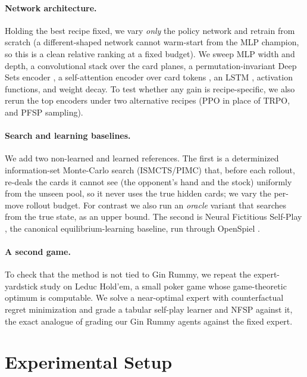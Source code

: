 \documentclass[letterpaper]{article} %
\begin{document}
\paragraph{Network architecture.}
Holding the best recipe fixed, we vary \emph{only} the policy network and retrain
from scratch (a different-shaped network cannot warm-start from the MLP champion,
so this is a clean relative ranking at a fixed budget). We sweep MLP width and
depth, a convolutional stack over the card planes, a permutation-invariant Deep
Sets encoder \citep{deepsets}, a self-attention encoder over card tokens
\citep{transformer}, an LSTM \citep{lstm}, activation functions, and weight decay.
To test whether any gain is recipe-specific, we also rerun the top encoders under
two alternative recipes (PPO in place of TRPO, and PFSP sampling).

\paragraph{Search and learning baselines.}
We add two non-learned and learned references. The first is a determinized
information-set Monte-Carlo search (ISMCTS/PIMC) \citep{ismcts,pimc} that, before
each rollout, re-deals the cards it cannot see (the opponent's hand and the stock)
uniformly from the unseen pool, so it never uses the true hidden cards; we vary
the per-move rollout budget. For contrast we also run an \emph{oracle} variant
that searches from the true state, as an upper bound. The second is Neural
Fictitious Self-Play \citep{nfsp}, the canonical equilibrium-learning baseline,
run through OpenSpiel \citep{openspiel}.

\paragraph{A second game.}
To check that the method is not tied to Gin Rummy, we repeat the expert-yardstick
study on Leduc Hold'em, a small poker game whose game-theoretic optimum is
computable. We solve a near-optimal expert with counterfactual regret
minimization \citep{cfr,openspiel} and grade a tabular self-play learner and NFSP
against it, the exact analogue of grading our Gin Rummy agents against the fixed
expert.

\section{Experimental Setup}
\end{document}
